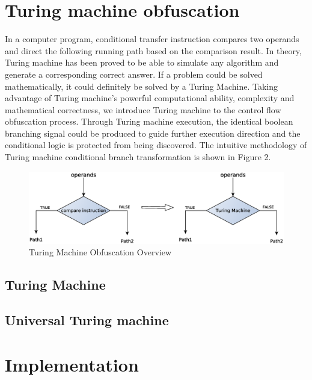 \documentclass[lnicst]{svmultln}
\begin{document}
%
\section{Turing machine obfuscation}
%
In a computer program, conditional transfer instruction compares two operands and direct the following running path based on the comparison result. In theory, Turing machine has been proved to be able to simulate any algorithm and generate a corresponding correct answer. If a problem could be solved mathematically, it could definitely be solved by a Turing Machine. Taking advantage of Turing machine's powerful computational ability, complexity and mathematical correctness, we introduce Turing machine to the control flow obfuscation process. Through Turing machine execution, the identical boolean branching signal could be produced to guide further execution direction and the conditional logic is protected from being discovered. The intuitive methodology of Turing machine conditional branch transformation is shown in Figure 2.
\begin{figure}
 \includegraphics[width=\linewidth]{figure2.eps}
 \caption{Turing Machine Obfuscation Overview}
 \label{Figure 2}
\end{figure}
\subsection{Turing Machine}

\subsection{Universal Turing machine}

\section{Implementation}
\end{document}
